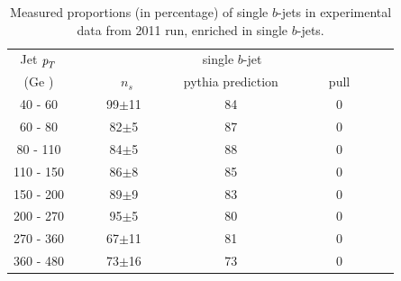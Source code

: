 \begin{table}[!hbt] %
\renewcommand{\arraystretch}{1.2}
\centering
\begin{tabular}{ | c || c | c | c ||}
  \hline
  Jet ${\emph{p}_{T}}$ & \multicolumn{3}{c||}{single $b$-jet}\\ \cline{2-4}
    (Ge ) & ~~~~~~~$n_s$~~~~~~ & pythia prediction & ~~~~~~pull~~~~~~\\ \hline
   40 - 60 &  99$\pm$11 & 84   & 0 \\  
   60 - 80 &  82$\pm$5  &  87  & 0\\ 
   80 - 110&  84$\pm$5  &  88 & 0\\ 
  110 - 150&  86$\pm$8  &  85 & 0\\ 
  150 - 200&  89$\pm$9  &  83 & 0 \\ 
  200 - 270&  95$\pm$5  &  80 & 0 \\ 
  270 - 360&  67$\pm$11  &  81 & 0 \\ 
  360 - 480&  73$\pm$16  &  73 & 0 \\ \hline
\end{tabular}
\caption{Measured proportions (in percentage) of single $b$-jets in experimental data from 2011 run, enriched in single $b$-jets.}
\label{tb:fitfractions2btagS}
\end{table}


